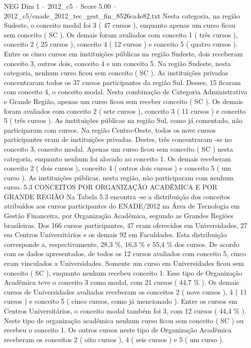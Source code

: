 \begin{textsample}{NEG Dim 1 – 2012\_c5 – Score 5.00 – 2012\_c5/enade\_2012\_tec\_gest\_fin\_8526ca4e82.txt}
Nesta categoria, na região Sudeste, o conceito modal foi 3 ( 47 cursos ), enquanto apenas um curso ficou sem conceito ( SC ).
Os demais foram avaliados com conceito 1 ( três cursos ), conceito 2 ( 25 cursos ), conceito 4 ( 12 cursos ) e conceito 5 ( quatro cursos ).
Entre os cinco cursos em instituições públicas na região Sudeste, dois receberam conceito 3, outros dois, conceito 4 e um conceito 5.
Na região Sudeste, nesta categoria, nenhum curso ficou sem conceito ( SC ).
As instituições privadas concentraram todos os 37 cursos participantes da região Sul.
Desses, 15 ficaram com conceito 4, o conceito modal.
Nesta combinação de Categoria Administrativa e Grande Região, apenas um curso ficou sem receber conceito ( SC ).
Os demais foram avaliados com conceito 2 ( sete cursos ), conceito 3 ( 11 cursos ) e conceito 5 ( três cursos ).
As instituições públicas na região Sul, como já comentado, não participaram com cursos.
Na região Centro-Oeste, todos os nove cursos participantes eram de instituições privadas.
Destes, três concentraram -se no conceito 3, conceito modal.
Apenas um curso ficou sem conceito ( SC ) nesta categoria, enquanto nenhum foi alocado ao conceito 1.
Os demais receberam conceito 2 ( dois cursos ), conceito 4 ( outros dois cursos ) e conceito 5 ( um curso ).
As instituições públicas, nesta região, não participaram com nenhum curso. 5.3 CONCEITOS POR ORGANIZAÇÃO ACADÊMICA E POR GRANDE REGIÃO Na Tabela 5.3 encontra -se a distribuição dos conceitos atribuídos aos cursos participantes do ENADE/2012 na Área de Tecnologia em Gestão Financeira, por Organização Acadêmica, segundo as Grandes Regiões brasileiras.
Dos 166 cursos participantes, 47 eram oferecidos em Universidades, 27 em Centros Universitários e os demais 92 em Faculdades.
Esta distribuição corresponde a, respectivamente, 28,3 \%, 16,3 \% e 55,4 \% dos cursos.
De acordo com os dados apresentados, de todos os 12 cursos avaliados com conceito 5, cinco eram vinculados a Universidades.
Somente um curso em Universidades ficou sem conceito ( SC ), enquanto nenhum recebeu conceito 1.
Esse tipo de Organização Acadêmica teve o conceito 3 como modal, com 21 cursos ( 44,7 \% ).
Os demais cursos de Universidades avaliados receberam os conceitos 2 ( nove cursos ), 4 ( 11 cursos ) e conceito 5 ( cinco cursos, como já mencionado ).
Entre os cursos em Centros Universitários, o conceito modal também foi 3, com 12 cursos ( 44,4 \% ).
Neste tipo de organização acadêmica nenhum curso ficou sem conceito ( SC ) ou recebeu o conceito 1.
Os outros cursos neste tipo de Organização Acadêmica receberam os conceitos 2 ( oito cursos ), 4 ( seis cursos ) e 5 ( um curso ).

\end{textsample}
